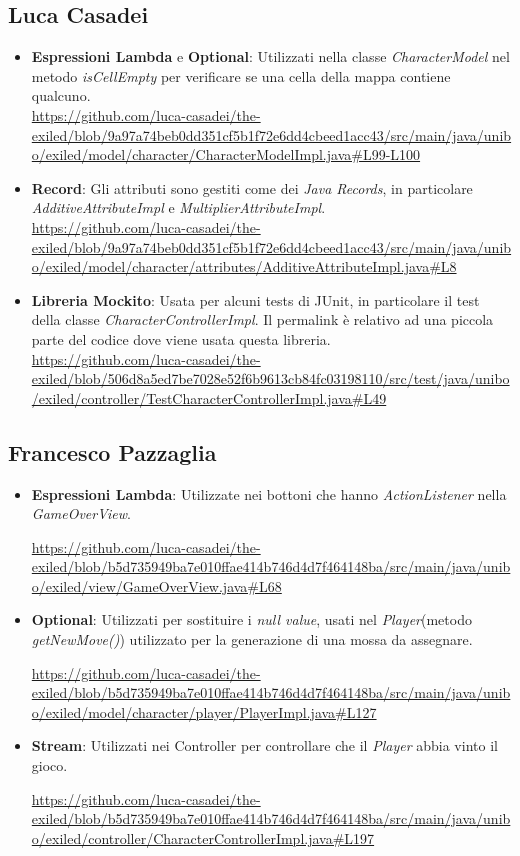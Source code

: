 \documentclass[a4paper,12pt]{report}
\begin{document}
\subsection*{Luca Casadei}
\begin{itemize}
	\item \textbf{Espressioni Lambda} e \textbf{Optional}: Utilizzati nella classe \textit{CharacterModel} nel metodo \textit{isCellEmpty} per verificare se una cella della mappa contiene qualcuno.\\
	\url{https://github.com/luca-casadei/the-exiled/blob/9a97a74beb0dd351cf5b1f72e6dd4cbeed1acc43/src/main/java/unibo/exiled/model/character/CharacterModelImpl.java#L99-L100}
	\item \textbf{Record}: Gli attributi sono gestiti come dei \textit{Java Records}, in particolare \textit{AdditiveAttributeImpl} e \textit{MultiplierAttributeImpl}.\\
	\url{https://github.com/luca-casadei/the-exiled/blob/9a97a74beb0dd351cf5b1f72e6dd4cbeed1acc43/src/main/java/unibo/exiled/model/character/attributes/AdditiveAttributeImpl.java#L8}
	\item \textbf{Libreria Mockito}: Usata per alcuni tests di JUnit, in particolare il test della classe \textit{CharacterControllerImpl}. Il permalink è relativo ad una piccola parte del codice dove viene usata questa libreria.\\
	\url{https://github.com/luca-casadei/the-exiled/blob/506d8a5ed7be7028e52f6b9613cb84fc03198110/src/test/java/unibo/exiled/controller/TestCharacterControllerImpl.java#L49}
\end{itemize}

\subsection*{Francesco Pazzaglia}

\begin{itemize}
	\item \textbf{Espressioni Lambda}: Utilizzate nei bottoni che hanno \textit{ActionListener} nella \textit{GameOverView}.
	
	\url{https://github.com/luca-casadei/the-exiled/blob/b5d735949ba7e010ffae414b746d4d7f464148ba/src/main/java/unibo/exiled/view/GameOverView.java#L68}
	
	\item \textbf{Optional}: Utilizzati per sostituire i \textit{null value}, usati nel \textit{Player}(metodo \textit{getNewMove()}) utilizzato per la generazione di una mossa da assegnare.
	
	\url{https://github.com/luca-casadei/the-exiled/blob/b5d735949ba7e010ffae414b746d4d7f464148ba/src/main/java/unibo/exiled/model/character/player/PlayerImpl.java#L127}
	
	\item \textbf{Stream}: Utilizzati nei Controller per controllare che il \textit{Player} abbia vinto il gioco.
	
	\url{https://github.com/luca-casadei/the-exiled/blob/b5d735949ba7e010ffae414b746d4d7f464148ba/src/main/java/unibo/exiled/controller/CharacterControllerImpl.java#L197}
\end{itemize}
\end{document}
